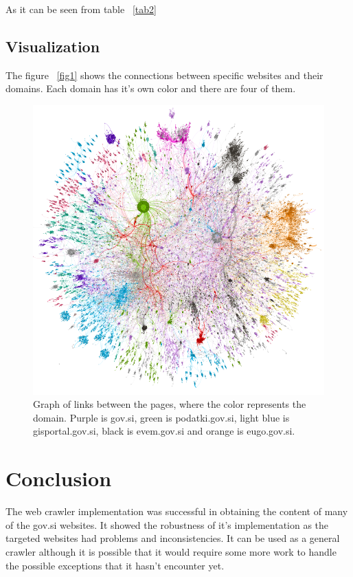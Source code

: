 \documentclass[9pt]{IEEEtran}
\begin{document}
As it can be seen from table ~\ref{tab2} 

\subsection{Visualization}

The figure ~\ref{fig1} shows the connections between specific websites and their domains.
Each domain has it's own color and there are four of them.
 
\begin{figure}[h]
    \centering
    \includegraphics[width=1\columnwidth]{data.png}
    \caption{Graph of links between the pages, where the color represents the domain. Purple is gov.si, green is podatki.gov.si, light blue is gisportal.gov.si, black is evem.gov.si and orange is eugo.gov.si.}
    \label{fig:office}
\end{figure}

\section{Conclusion}

The web crawler implementation was successful in obtaining the content of many of the gov.si websites.
It showed the robustness of it's implementation as the targeted websites had problems and inconsistencies.
It can be used as a general crawler although it is possible that it would require some more work to handle the possible exceptions that it hasn't encounter yet.


%
\end{document}
